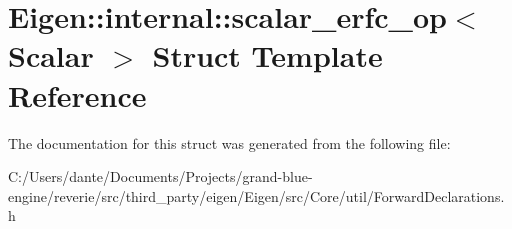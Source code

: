 \hypertarget{struct_eigen_1_1internal_1_1scalar__erfc__op}{}\section{Eigen\+::internal\+::scalar\+\_\+erfc\+\_\+op$<$ Scalar $>$ Struct Template Reference}
\label{struct_eigen_1_1internal_1_1scalar__erfc__op}


The documentation for this struct was generated from the following file\+:\begin{DoxyCompactItemize}
\item 
C\+:/\+Users/dante/\+Documents/\+Projects/grand-\/blue-\/engine/reverie/src/third\+\_\+party/eigen/\+Eigen/src/\+Core/util/Forward\+Declarations.\+h\end{DoxyCompactItemize}
